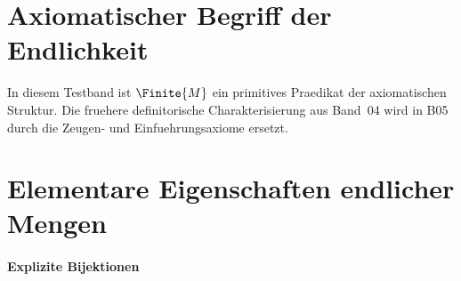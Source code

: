 \documentclass[main.tex]{subfiles}
\begin{document}
\section{Axiomatischer Begriff der Endlichkeit}

\noindent
In diesem Testband ist \(\Finite{M}\) ein primitives Praedikat der
axiomatischen Struktur. Die fruehere definitorische Charakterisierung aus
Band~04 wird in B05 durch die Zeugen- und Einfuehrungsaxiome ersetzt.

\section{Elementare Eigenschaften endlicher Mengen}

\paragraph{Explizite Bijektionen}
\end{document}
